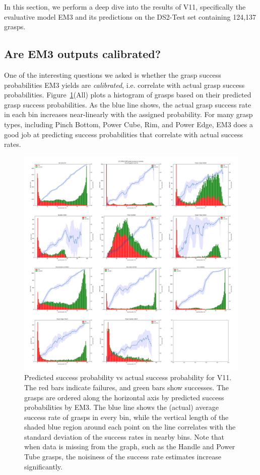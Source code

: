 
\noindent
In this section, we perform a deep dive into the results of V11, specifically the evaluative model EM3 and its predictions on the DS2-Test set containing 124,137 grasps. 

\subsection{Are EM3 outputs calibrated?}
\noindent

One of the interesting questions we asked is whether the grasp success probabilities EM3 yields are \textit{calibrated}, i.e. correlate with actual grasp success probabilities. Figure~\ref{fig:calibrate}(All) plots a histogram of grasps based on their predicted grasp success probabilities. As the blue line shows, the actual grasp success rate in each bin increases near-linearly with the assigned probability. For many grasp types, including Pinch Bottom, Power Cube, Rim, and Power Edge, EM3 does a good job at predicting success probabilities that correlate with actual success rates. 

\begin{figure}
\centering
\includegraphics[width=0.8\columnwidth]{images/post-analysis/[4] V11_pred_success_vs_success.png}
\caption{Predicted success probability vs actual success probability for V11. The red bars indicate failures, and green bars show successes. The grasps are ordered along the horizontal axis by predicted success probabilities by EM3. The blue line shows the (actual) average success rate of grasps in every bin, while the vertical length of the shaded blue region around each point on the line correlates with the standard deviation of the success rates in nearby bins. Note that when data is missing from the graph, such as the Handle and Power Tube grasps, the noisiness of the success rate estimates increase significantly.}
\label{fig:calibrate}
\end{figure}


